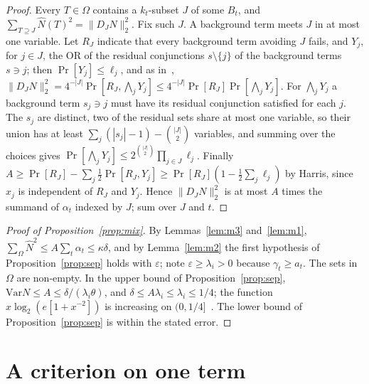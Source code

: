 \documentclass[11pt]{amsart}
\theoremstyle{remark}
\newcommand{\Var}{\mathrm{Var}}
\begin{document}
\begin{proof}
Every $T\in\Omega$ contains a $k_t$-subset $J$ of some $B_t$, and $\sum_{T\supseteq J}\hat N(T)^2=\|D_JN\|_2^2$. Fix
such $J$. A background term meets $J$ in at most one variable. Let $R_J$ indicate that every background term
avoiding $J$ fails, and $Y_j$, for $j\in J$, the OR of the residual conjunctions $s\setminus\{j\}$ of the background terms
$s\ni j$; then $\Pr[Y_j]\le\ell_j$, and as in~\cite[Lemma~5]{Shm6}, $\|D_JN\|_2^2=4^{-|J|}\Pr[R_J,\bigwedge_jY_j]\le
4^{-|J|}\Pr[R_J]\Pr[\bigwedge_jY_j]$. For $\bigwedge_jY_j$ a background term $s_j\ni j$ must have its residual conjunction
satisfied for each $j$. The $s_j$ are distinct, two of the residual sets share at most one variable, so their union has
at least $\sum_j(|s_j|-1)-\binom{|J|}2$ variables, and summing over the choices gives $\Pr[\bigwedge_jY_j]\le2^{\binom{|J|}2}\prod_{j\in J}\ell_j$. Finally $A\ge\Pr[R_J]-\sum_j\frac12\Pr[R_J,Y_j]\ge\Pr[R_J](1-\frac12\sum_j\ell_j)$ by Harris,
since $x_j$ is independent of $R_J$ and $Y_j$. Hence $\|D_JN\|_2^2$ is at most $A$ times the summand of $\alpha_t$
indexed by $J$; sum over $J$ and $t$.
\end{proof}

\begin{proof}[Proof of Proposition~\ref{prop:mix}]
By Lemmas~\ref{lem:m3} and~\ref{lem:m1}, $\sum_\Omega\hat N^2\le A\sum_t\alpha_t\le\kappa\delta$, and by
Lemma~\ref{lem:m2} the first hypothesis of Proposition~\ref{prop:sep} holds with $\varepsilon$; note $\varepsilon\ge
{\lambda_i}>0$ because $\gamma_t\ge a_t$. The sets in $\Omega$ are non-empty. In the upper bound of Proposition~\ref{prop:sep},
$\Var N\le A\le\delta/({\lambda_i}\theta)$, and $\delta\le A{\lambda_i}\le {\lambda_i}\le1/4$; the function $x\log_2(e[1+x^{-2}])$ is increasing on
$(0,1/4]$~\cite{Shm6}. The lower bound of Proposition~\ref{prop:sep} is within the stated error.
\end{proof}

\section{A criterion on one term}\label{sec:local}
\end{document}
